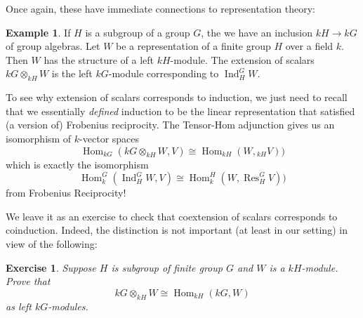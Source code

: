 \documentclass[12pt]{article}
\theoremstyle{plain}
\newtheorem{exercise}[theorem]{Exercise}
\theoremstyle{definition}
\newtheorem{example}[theorem]{Example}
\theoremstyle{remark}
\numberwithin{equation}{section}
\begin{document}
Once again, these have immediate connections to representation theory:

\begin{example}
If $H$ is a subgroup of a group $G$, the we have an inclusion
$kH \to kG$ of group algebras.
Let $W$ be a representation of a finite group $H$ over a field $k$.
Then $W$ has the structure of a left $kH$-module.
The extension of scalars $kG \otimes_{kH} W$
is the left $kG$-module corresponding to $\operatorname{Ind}_H^G W$.
\end{example} 

To see why extension of scalars corresponds to induction, we just need
to recall that we essentially \emph{defined} induction to be the linear
representation that satisfied (a version of) Frobenius reciprocity.
The Tensor-Hom adjunction gives us an isomorphism of $k$-vector spaces
\[
\operatorname{Hom}_{kG}(kG \otimes_{kH} W,V)
\cong \operatorname{Hom}_{kH}(W,{}_{kH}V))
\]
which is exactly the isomorphism
\[
\operatorname{Hom}_k^G(\operatorname{Ind}_H^G W,V)
\cong \operatorname{Hom}_k^H(W,\operatorname{Res}_H^G V))
\]
from Frobenius Reciprocity!

We leave it as an exercise to check that coextension of scalars
corresponds to coinduction.  Indeed, the distinction is not important
(at least in our setting) in view of the following:

\begin{exercise}
Suppose $H$ is subgroup of finite group $G$ and $W$ is a $kH$-module.
Prove that
\[
kG \otimes_{kH} W \cong \operatorname{Hom}_{kH}(kG,W)
\]
as left $kG$-modules.
\end{exercise}



\end{document}
